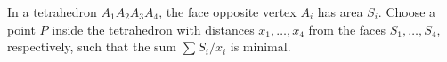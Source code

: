 In a tetrahedron $A_1A_2A_3A_4$, the face opposite vertex $A_i$ has area $S_i$. Choose a point $P$ inside the tetrahedron with distances $x_1, \ldots, x_4$ from the faces $S_1, \ldots, S_4$, respectively, such that the sum $\sum S_i/x_i$ is minimal.
